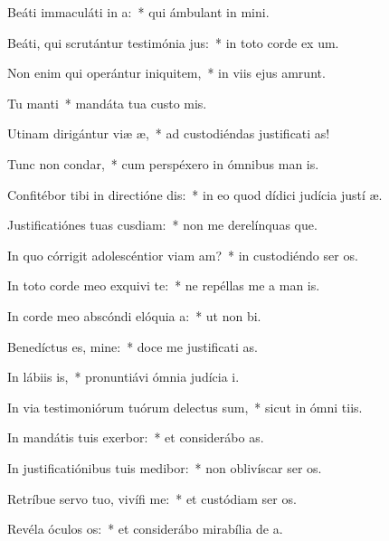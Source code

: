 \item Beáti immaculáti in a:~* qui ámbulant in  mini.
\item Beáti, qui scrutántur testimónia jus:~* in toto corde ex um.
\item Non enim qui operántur iniquitem,~* in viis ejus amrunt.
\item Tu manti~* mandáta tua custo mis.
\item Utinam dirigántur viæ æ,~* ad custodiéndas justificati as!
\item Tunc non condar,~* cum perspéxero in ómnibus man is.
\item Confitébor tibi in directióne dis:~* in eo quod dídici judícia justí æ.
\item Justificatiónes tuas cusdiam:~* non me derelínquas que.
\item In quo córrigit adolescéntior viam am?~* in custodiéndo ser os.
\item In toto corde meo exquivi te:~* ne repéllas me a man is.
\item In corde meo abscóndi elóquia a:~* ut non  bi.
\item Benedíctus es, mine:~* doce me justificati as.
\item In lábiis is,~* pronuntiávi ómnia judícia  i.
\item In via testimoniórum tuórum delectus sum,~* sicut in ómni tiis.
\item In mandátis tuis exerbor:~* et considerábo  as.
\item In justificatiónibus tuis medibor:~* non oblivíscar ser os.
\item Retríbue servo tuo, vivífi me:~* et custódiam ser os.
\item Revéla óculos os:~* et considerábo mirabília de  a.
